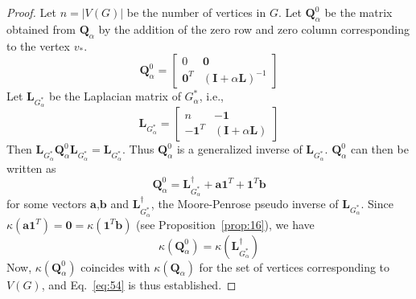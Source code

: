 \begin{proof}\citep{chebotarev02:_fores_metric_for_graph_vertic}
  Let $n = |V(G)|$ be the number of vertices in $G$. Let
  $\mathbf{Q}_{\alpha}^{0}$ be the matrix obtained from
  $\mathbf{Q}_{\alpha}$ by the addition of the zero row and zero
  column corresponding to the vertex $v_*$.
  \begin{equation}
    \label{eq:58}
    \mathbf{Q}_{\alpha}^{0}  =  \left[ \begin{array}{c|c}
        0 & \bm{0} \\ \hline
        \bm{0}^{T} & (\mathbf{I} + \alpha \mathbf{L})^{-1}
        \end{array} \right]
  \end{equation}
  Let $\mathbf{L}_{G_{\alpha}^{*}}$ be the Laplacian matrix of $G_{\alpha}^{*}$, i.e., 
  \begin{equation}
    \label{eq:57}
    \mathbf{L}_{G_{\alpha}^{*}} = \left[ \begin{array}{c|c}
        n & \bm{-1} \\ \hline
        \bm{-1}^{T} & (\mathbf{I} + \alpha \mathbf{L})
        \end{array} \right]
  \end{equation}
  Then $\mathbf{L}_{G_{\alpha}^{*}}\mathbf{Q}_{\alpha}^{0}\mathbf{L}_{G_{\alpha}^{*}} =
  \mathbf{L}_{G_{\alpha}^{*}}$. Thus $\mathbf{Q}_{\alpha}^{0}$ is a generalized
  inverse of $\mathbf{L}_{G_{\alpha}^{*}}$. $\mathbf{Q}_{\alpha}^{0}$ can then be
  written as 
  \begin{equation}
    \label{eq:59}
    \mathbf{Q}_{\alpha}^{0} = \mathbf{L}_{G_{\alpha}^{*}}^{\dagger} +
    \bm{a}\bm{1}^{T} + \bm{1}^{T}\bm{b}
  \end{equation}
  for some vectors $\bm{a}$,$\bm{b}$ and
  $\mathbf{L}_{G_{\alpha}^{*}}^{\dagger}$, the Moore-Penrose pseudo
  inverse of $\mathbf{L}_{G_{\alpha}^{*}}$. Since
  $\kappa(\bm{a}\bm{1}^{T}) = \mathbf{0} = \kappa(\bm{1}^{T}\bm{b})$
  (see Proposition~\ref{prop:16}), we have
  \begin{equation}
    \label{eq:60}
    \kappa(\mathbf{Q}_{\alpha}^{0}) = \kappa(\mathbf{L}_{G_{\alpha}^{*}}^{\dagger})
  \end{equation}
  Now, $\kappa(\mathbf{Q}_{\alpha}^{0})$ coincides with
  $\kappa(\mathbf{Q}_{\alpha})$ for the set of vertices corresponding
  to $V(G)$, and Eq.~\eqref{eq:54} is thus established.
\end{proof}

